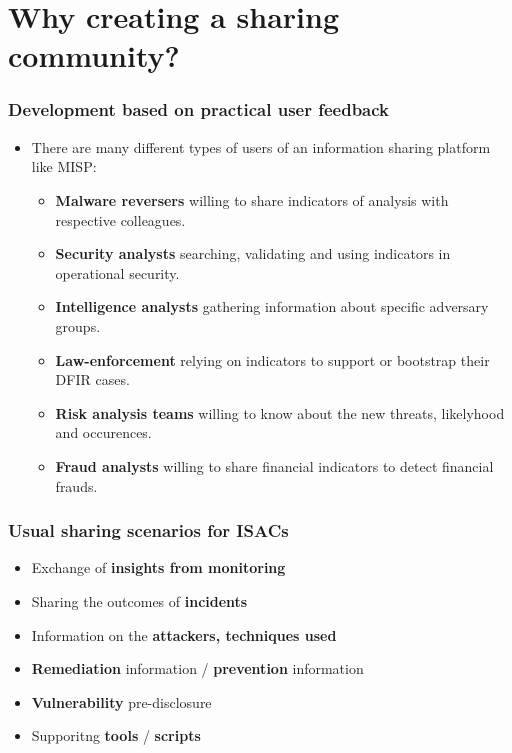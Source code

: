 \section{Why creating a sharing\\ community?}

\begin{frame}
    \frametitle{Development based on practical user feedback}
    \begin{itemize}
        \item There are many different types of users of an information sharing platform like MISP:
        \begin{itemize}
            \item {\bf Malware reversers} willing to share indicators of analysis with respective colleagues.
            \item {\bf Security analysts} searching, validating and using indicators in operational security.
            \item {\bf Intelligence analysts} gathering information about specific adversary groups.
            \item {\bf Law-enforcement} relying on indicators to support or bootstrap their DFIR cases.
            \item {\bf Risk analysis teams} willing to know about the new threats, likelyhood and occurences.
            \item {\bf Fraud analysts} willing to share financial indicators to detect financial frauds.
        \end{itemize}
    \end{itemize}
\end{frame}

\begin{frame}
	\frametitle{Usual sharing scenarios for ISACs}
	\begin{itemize}
		\item Exchange of {\bf insights from monitoring}
		\item Sharing the outcomes of {\bf incidents}
		\item Information on the {\bf attackers, techniques used}
		\item {\bf Remediation} information / {\bf prevention} information
		\item {\bf Vulnerability} pre-disclosure
		\item Supporitng {\bf tools} / {\bf scripts}
	\end{itemize}
\end{frame}

